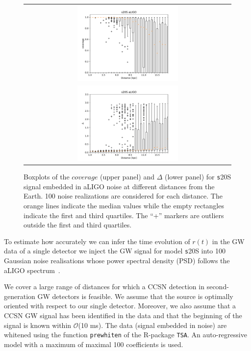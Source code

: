 \begin{figure}[t]
  \centering
  \begin{tabular}{c}
    \includegraphics[width=0.5\textwidth]{plots/s20--SFHo_covpbb_boxplot_aLIGO} \\
    \includegraphics[width=0.5\textwidth]{plots/s20--SFHo_error_boxplot_aLIGO} \\
  \end{tabular}
    
 \caption{Boxplots of the $coverage$ (upper panel) and $\Delta$ (lower panel) for {\texttt s20S} signal embedded in aLIGO noise at different distances from the Earth. 100 noise realizations are considered for each distance. The orange lines indicate the median values while the empty rectangles indicate the first and third quartiles. The ``+'' markers are outliers outside the first and third quartiles.}
  \label{fig:s20results}
\end{figure}

To estimate how accurately we can infer the time evolution of $r(t)$ in the GW data of a single
detector we inject the GW signal for model {\texttt s20S} into 
100 Gaussian noise realisations whose power spectral density (PSD) follows the aLIGO
spectrum~\citep{aLIGOsens:2018}. %

We cover a large range of distances for which a CCSN detection in second-generation GW detectors is feasible. We assume that the source is optimally oriented with respect to our single detector. Moreover, we also assume that a CCSN GW signal has been identified in the data and that the beginning of the signal is known within {$\mathcal O$}(10 ms). The data (signal embedded in noise) are whitened using the function {\tt prewhiten} of the R-package {\tt TSA}. An auto-regressive model with a maximum of maximal 100 coefficients is used.    


